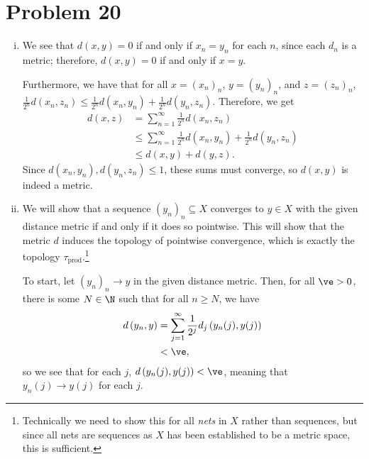 \documentclass[10pt]{mypackage}
\begin{document}
\section{Problem 20}%
\begin{enumerate}[(i)]
  \item We see that $d\left( x,y \right) = 0$ if and only if $x_n = y_n$ for each $n$, since each $d_n$ is a metric; therefore, $d\left( x,y \right) = 0$ if and only if $x = y$.\newline

    Furthermore, we have that for all $x = \left( x_n \right)_n$, $y = \left( y_n \right)_n$, and $z = \left( z_n \right)_n$, $\frac{1}{2^{n}}d\left( x_n,z_n \right) \leq \frac{1}{2^{n}}d\left( x_n,y_n \right) + \frac{1}{2^{n}}d\left( y_n,z_n \right)$. Therefore, we get
    \begin{align*}
      d\left( x,z \right) &= \sum_{n=1}^{\infty} \frac{1}{2^{n}}d\left( x_n,z_n \right)\\
                          &\leq \sum_{n=1}^{\infty}\frac{1}{2^{n}}d\left( x_n,y_n \right) + \frac{1}{2^{n}}d\left( y_n,z_n \right)\\
                          &\leq d\left( x,y \right) + d\left( y,z \right).
    \end{align*}
    Since $d\left( x_n,y_n \right),d\left( y_n,z_n \right) \leq 1$, these sums must converge, so $d\left( x,y \right)$ is indeed a metric.
  \item We will show that a sequence $\left( y_n \right)_n\subseteq X$ converges to $y\in X$ with the given distance metric if and only if it does so pointwise. This will show that the metric $d$ induces the topology of pointwise convergence, which is exactly the topology $\tau_{\text{prod}}$.\footnote{Technically we need to show this for all \textit{nets} in $X$ rather than sequences, but since all nets are sequences as $X$ has been established to be a metric space, this is sufficient.}\newline

    To start, let $\left( y_n \right)_n\rightarrow y$ in the given distance metric. Then, for all $\ve > 0$, there is some $N\in \N$ such that for all $n \geq N$, we have
    \begin{align*}
      d\left( y_n,y \right) &= \sum_{j=1}^{\infty}\frac{1}{2^{j}} d_j\left( y_n(j),y(j) \right)\\
                            &< \ve,
    \end{align*}
    so we see that for each $j$, $d\left( y_n(j),y(j) \right) < \ve$, meaning that $y_n(j)\rightarrow y(j)$ for each $j$.\newline


\end{enumerate}
\end{document}
